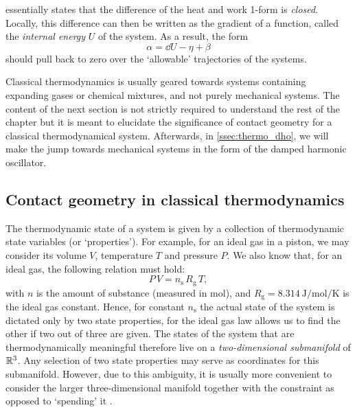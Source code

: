  essentially states that the difference of the heat and work 1-form is \emph{closed}. Locally, this difference can then be written as the gradient of a function, called the \emph{internal energy} $U$ of the system. As a result, the form 
$$ \alpha = \dd{U} - \eta + \beta $$
should pull back to zero over the `allowable' trajectories of the systems.

Classical thermodynamics is usually geared towards systems containing expanding gases or chemical mixtures, and not purely mechanical systems. The content of the next section is not strictly required to understand the rest of the chapter but it is meant to elucidate the significance of contact geometry for a classical thermodynamical system. Afterwards, in \cref{ssec:thermo_dho}, we will make the jump towards mechanical systems in the form of the damped harmonic oscillator.

\subsection{Contact geometry in classical thermodynamics} 
The thermodynamic state of a system is given by a collection of thermodynamic state variables (or `properties'). For example, for an ideal gas in a piston, we may consider its volume $V$, temperature $T$ and pressure $P$. We also know that, for an ideal gas, the following relation must hold:
\begin{equation}
    P \, V = n_\text{s} \, R_\text{g} \, T,
    \label{eq:ideal_gas_pv}
\end{equation}
with $n$ is the amount of substance (measured in \si{\mole}), and $R_\text{g} = \SI{8.314}{\joule \per \mole \per \kelvin}$ is the ideal gas constant.  Hence, for constant $n_\text{s}$ the actual state of the system is dictated only by two state properties, for the ideal gas law allows us to find the other if two out of three are given. The states of the system that are thermodynamically meaningful therefore live on a \emph{two-dimensional submanifold} of $\mathbb{R}^3$. Any selection of two state properties may serve as coordinates for this submanifold. However, due to this ambiguity, it is usually more convenient to consider the larger three-dimensional manifold together with the constraint as opposed to `spending' it \cite{Balian2001, Giancoli2014}.

